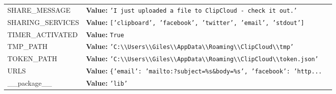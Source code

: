 \begin{longtable}{|p{\varnamewidth}|p{\vardescrwidth}|l}
\cline{1-2}
\raggedright S\-H\-A\-R\-E\-\_\-M\-E\-S\-S\-A\-G\-E\- & \raggedright \textbf{Value:} 
{\tt \texttt{'}\texttt{I just uploaded a file to ClipCloud - check it out.}\texttt{'}}&\\
\cline{1-2}
\raggedright S\-H\-A\-R\-I\-N\-G\-\_\-S\-E\-R\-V\-I\-C\-E\-S\- & \raggedright \textbf{Value:} 
{\tt \texttt{[}\texttt{'}\texttt{clipboard}\texttt{'}\texttt{, }\texttt{'}\texttt{facebook}\texttt{'}\texttt{, }\texttt{'}\texttt{twitter}\texttt{'}\texttt{, }\texttt{'}\texttt{email}\texttt{'}\texttt{, }\texttt{'}\texttt{stdout}\texttt{'}\texttt{]}}&\\
\cline{1-2}
\raggedright T\-I\-M\-E\-R\-\_\-A\-C\-T\-I\-V\-A\-T\-E\-D\- & \raggedright \textbf{Value:} 
{\tt True}&\\
\cline{1-2}
\raggedright T\-M\-P\-\_\-P\-A\-T\-H\- & \raggedright \textbf{Value:} 
{\tt \texttt{'}\texttt{C:{\textbackslash}{\textbackslash}Users{\textbackslash}{\textbackslash}Giles{\textbackslash}{\textbackslash}AppData{\textbackslash}{\textbackslash}Roaming{\textbackslash}{\textbackslash}ClipCloud{\textbackslash}{\textbackslash}tmp}\texttt{'}}&\\
\cline{1-2}
\raggedright T\-O\-K\-E\-N\-\_\-P\-A\-T\-H\- & \raggedright \textbf{Value:} 
{\tt \texttt{'}\texttt{C:{\textbackslash}{\textbackslash}Users{\textbackslash}{\textbackslash}Giles{\textbackslash}{\textbackslash}AppData{\textbackslash}{\textbackslash}Roaming{\textbackslash}{\textbackslash}ClipCloud{\textbackslash}{\textbackslash}token.json}\texttt{'}}&\\
\cline{1-2}
\raggedright U\-R\-L\-S\- & \raggedright \textbf{Value:} 
{\tt \texttt{\{}\texttt{'}\texttt{email}\texttt{'}\texttt{: }\texttt{'}\texttt{mailto:?subject=\%s\&body=\%s}\texttt{'}\texttt{, }\texttt{'}\texttt{facebook}\texttt{'}\texttt{: }\texttt{'}\texttt{http}\texttt{...}}&\\
\cline{1-2}
\raggedright \_\-\_\-p\-a\-c\-k\-a\-g\-e\-\_\-\_\- & \raggedright \textbf{Value:} 
{\tt \texttt{'}\texttt{lib}\texttt{'}}&\\
\cline{1-2}
\end{longtable}

